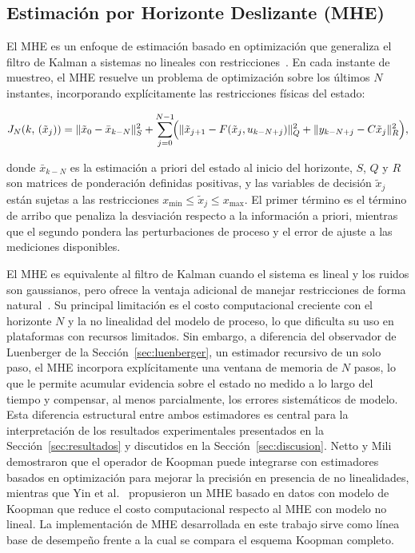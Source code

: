 \documentclass[12pt,letterpaper]{article}
\begin{document}
\subsection{Estimación por Horizonte Deslizante (MHE)}
\label{sec:mhe_marco}

El MHE es un enfoque de estimación basado en
optimización que generaliza el filtro de Kalman a sistemas no lineales con
restricciones~\cite{rawlings2009}. En cada instante de muestreo, el MHE resuelve un
problema de optimización sobre los últimos $N$ instantes, incorporando
explícitamente las restricciones físicas del estado:

\begin{equation}
J_N(k,\,(\tilde{x}_j)) = \|\tilde{x}_0 - \bar{x}_{k-N}\|_S^2
+ \sum_{j=0}^{N-1}\!\Bigl(\|\tilde{x}_{j+1} - F(\tilde{x}_j,u_{k-N+j})\|_Q^2
+ \|y_{k-N+j} - C\tilde{x}_j\|_R^2\Bigr),
\label{eq:mhe_cost}
\end{equation}

donde $\bar{x}_{k-N}$ es la estimación a priori del estado al inicio del horizonte,
$S$, $Q$ y $R$ son matrices de ponderación definidas positivas, y las variables de
decisión $\tilde{x}_j$ están sujetas a las restricciones
$x_{\min} \leq \tilde{x}_j \leq x_{\max}$. El primer término es el término de arribo
que penaliza la desviación respecto a la información a priori, mientras que el
segundo pondera las perturbaciones de proceso y el error de ajuste a las mediciones
disponibles.

El MHE es equivalente al filtro de Kalman cuando el sistema es lineal y los ruidos
son gaussianos, pero ofrece la ventaja adicional de manejar restricciones de forma
natural~\cite{rawlings2009}. Su principal limitación es el costo computacional
creciente con el horizonte $N$ y la no linealidad del modelo de proceso, lo que
dificulta su uso en plataformas con recursos limitados. Sin embargo, a diferencia del
observador de Luenberger de la Sección~\ref{sec:luenberger}, un estimador recursivo
de un solo paso, el MHE incorpora explícitamente una ventana de memoria de $N$
pasos, lo que le permite acumular evidencia sobre el estado no medido a lo largo del
tiempo y compensar, al menos parcialmente, los errores sistemáticos de modelo. Esta
diferencia estructural entre ambos estimadores es central para la interpretación de
los resultados experimentales presentados en la
Sección~\ref{sec:resultados} y discutidos en la
Sección~\ref{sec:discusion}. Netto y Mili~\cite{netto2020} demostraron que el
operador de Koopman puede integrarse con estimadores basados en optimización para
mejorar la precisión en presencia de no linealidades, mientras que Yin et
al.~\cite{yin2023} propusieron un MHE basado en datos con modelo de Koopman que
reduce el costo computacional respecto al MHE con modelo no lineal. La
implementación de MHE desarrollada en este trabajo sirve como línea base de
desempeño frente a la cual se compara el esquema Koopman completo.
\end{document}
